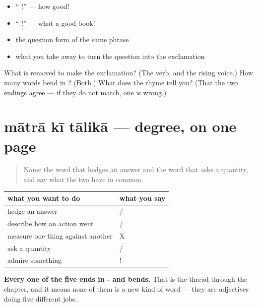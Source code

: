 \begin{itemize}
\raggedright
  \item \textquotedblleft{} !\textquotedblright{} — how good!
  \item \textquotedblleft{}  !\textquotedblright{} — what a good book!
  \item the question form of the same phrase
  \item what you take away to turn the question into the exclamation
\end{itemize}

\begin{tcolorbox}[breakable,colback=teal!4,colframe=teal!35!black,title={Before you move on}]
What is removed to make the exclamation? (The verb, and the rising voice.) How many words bend in \textbf{ }? (Both.) What does the rhyme tell you? (That the two endings agree — if they do not match, one is wrong.)
\end{tcolorbox}
\section[\texorpdfstring{\hi{मात्रा} \hi{की} \hi{तालिका} (mātrā kī tālikā)}{मात्रा की तालिका (mātrā kī tālikā)}]{mātrā kī tālikā — degree, on one page}

\label{lesson:HI-C92-repaso-maatra}



\begin{quote}
Name the word that hedges an answer and the word that asks a quantity, and say what the two have in common.
\end{quote}

\begin{grammarlens}[title={Grammar Lens: the five}]
\noindent
\begin{tabularx}{\linewidth}{@{}>{\raggedright\arraybackslash}X>{\raggedright\arraybackslash}X@{}}
\toprule
\textbf{what you want to do} & \textbf{what you say} \\
\midrule
hedge an answer & \hi{थोड़ा} / \hi{थोड़ी} \\
describe how an action went & \hi{अच्छा} / \hi{बुरा} \\
measure one thing against another & X \hi{से} \hi{बड़ा} \\
ask a quantity & \hi{कितना} / \hi{कितनी} \\
admire something & \hi{कितना} \hi{अच्छा}! \\
\bottomrule
\end{tabularx}

\textbf{Every one of the five ends in - and bends.} That is the thread through the chapter, and it means none of them is a new kind of word — they are adjectives doing five different jobs.
\end{grammarlens}

